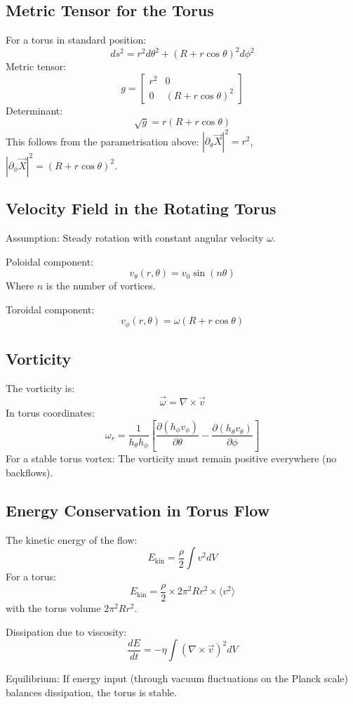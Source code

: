 \subsection{Metric Tensor for the Torus}
For a torus in standard position:
\[
ds^2 = r^2 d\theta^2 + (R + r \cos \theta)^2 d\phi^2
\]
Metric tensor:
\[
g = \begin{bmatrix}
	r^2 & 0 \\
	0 & (R + r \cos \theta)^2
\end{bmatrix}
\]
Determinant:
\[
\sqrt{g} = r(R + r \cos \theta)
\]
This follows from the parametrisation above: $|\partial_\theta \vec{X}|^2 = r^2$, $|\partial_\phi \vec{X}|^2 = (R + r\cos\theta)^2$.

\subsection{Velocity Field in the Rotating Torus}
Assumption: Steady rotation with constant angular velocity \( \omega \).

Poloidal component:
\[
v_\theta(r, \theta) = v_0 \sin(n \theta)
\]
Where \( n \) is the number of vortices.

Toroidal component:
\[
v_\phi(r, \theta) = \omega (R + r \cos \theta)
\]

\subsection{Vorticity}
The vorticity is:
\[
\vec{\omega} = \nabla \times \vec{v}
\]
In torus coordinates:
\[
\omega_r = \frac{1}{h_\theta h_\phi} \left[ \frac{\partial (h_\phi v_\phi)}{\partial \theta} - \frac{\partial (h_\theta v_\theta)}{\partial \phi} \right]
\]
For a stable torus vortex: The vorticity must remain positive everywhere (no backflows).

\subsection{Energy Conservation in Torus Flow}
The kinetic energy of the flow:
\[
E_{\text{kin}} = \frac{\rho}{2} \int v^2 dV
\]
For a torus:
\[
E_{\text{kin}} = \frac{\rho}{2} \times 2\pi^2 R r^2 \times \langle v^2 \rangle
\]
with the torus volume $2\pi^2 R r^2$.

Dissipation due to viscosity:
\[
\frac{dE}{dt} = -\eta \int (\nabla \times \vec{v})^2 dV
\]

Equilibrium: If energy input (through vacuum fluctuations on the Planck scale) balances dissipation, the torus is stable.

